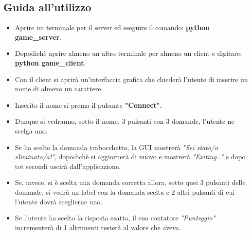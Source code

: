 \subsection{Guida all'utilizzo}
\begin{minipage}{.45\textwidth}
	\begin{itemize}
		\item \textsf{\normalsize Aprire un terminale per il server ed eseguire il comando: \textbf{python game\_server}.}
		\item \textsf{\normalsize Dopodichè aprire almeno un altro terminale per almeno un client e digitare: \textbf{python game\_client}.}
		\item \textsf{\normalsize Con il client si aprirà un'interfaccia grafica che chiederà l'utente di inserire un nome di almeno un carattere.}
		\item \textsf{\normalsize Inserito il nome si prema il pulsante \bf{"Connect"}.}
		\item \textsf{\normalsize Dunque si vedranno, sotto il nome, 3 pulsanti con 3 domande, l'utente ne scelga uno.}
		\item \textsf{\normalsize Se ha scelto la domanda trabocchetto, la GUI mostrerà \emph{"Sei stato/a eliminato/a!"}, dopodichè si aggiornerà di nuovo e mostrerà \emph{"Exiting.."} e dopo tot secondi uscirà dall'applicazione.}
		\item \textsf{\normalsize Se, invece, si è scelta una domanda corretta allora, sotto quei 3 pulsanti delle domande, si vedrà un label con la domanda scelta e 2 altri pulsanti di cui l'utente dovrà sceglierne uno.}
		\item \textsf{\normalsize Se l'utente ha scelto la risposta esatta, il suo contatore \emph{"Punteggio"} incrementerà di 1 altrimenti resterà al valore che aveva.}
	\end{itemize}
\end{minipage}
